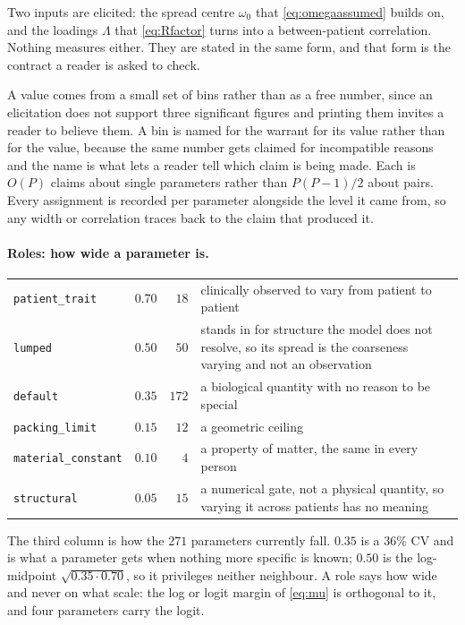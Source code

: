 \documentclass[11pt]{article}
\begin{document}
Two inputs are elicited: the spread centre $\omega_0$ that \eqref{eq:omegaassumed}
builds on, and the loadings $\Lambda$ that \eqref{eq:Rfactor} turns into a
between-patient correlation. Nothing measures either. They are stated in the same
form, and that form is the contract a reader is asked to check.

A value comes from a small set of bins rather than as a free number, since an
elicitation does not support three significant figures and printing them invites
a reader to believe them. A bin is named for the warrant for its value rather
than for the value, because the same number gets claimed for incompatible reasons
and the name is what lets a reader tell which claim is being made. Each is $O(P)$
claims about single parameters rather than $P(P-1)/2$ about pairs. Every
assignment is recorded per parameter alongside the level it came from, so any
width or correlation traces back to the claim that produced it.

\paragraph{Roles: how wide a parameter is.}
\begin{center}\small
\begin{tabularx}{0.95\textwidth}{@{}llrX@{}}
\toprule
\texttt{patient\_trait} & $0.70$ & $18$ & clinically observed to vary from patient to patient \\
\texttt{lumped} & $0.50$ & $50$ & stands in for structure the model does not resolve, so its spread is the coarseness varying and not an observation \\
\texttt{default} & $0.35$ & $172$ & a biological quantity with no reason to be special \\
\texttt{packing\_limit} & $0.15$ & $12$ & a geometric ceiling \\
\texttt{material\_constant} & $0.10$ & $4$ & a property of matter, the same in every person \\
\texttt{structural} & $0.05$ & $15$ & a numerical gate, not a physical quantity, so varying it across patients has no meaning \\
\bottomrule
\end{tabularx}
\end{center}
The third column is how the $271$ parameters currently fall. $0.35$ is a $36\%$
CV and is what a parameter gets when nothing more specific is known; $0.50$ is
the log-midpoint $\sqrt{0.35\cdot0.70}$, so it privileges neither neighbour. A
role says how wide and never on what scale: the log or logit margin of
\eqref{eq:mu} is orthogonal to it, and four parameters carry the logit.
\end{document}
